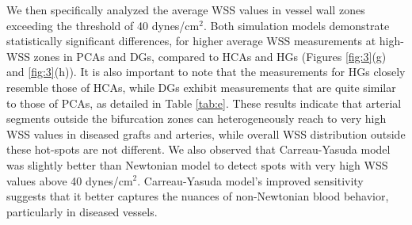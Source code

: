﻿\documentclass[12pt,a4paper]{article}
\theoremstyle{definition}
\numberwithin{equation}{section}
\begin{document}
We then specifically analyzed the average WSS values in vessel wall zones exceeding the threshold of 40 dynes/cm$^2$. Both simulation models demonstrate statistically significant differences, for higher average WSS measurements at high-WSS zones in PCAs and DGs, compared to HCAs and HGs (Figures \ref{fig:3}(g) and \ref{fig:3}(h)). It is also important to note that the measurements for HGs closely resemble those of HCAs, while DGs exhibit measurements that are quite similar to those of PCAs, as detailed in Table \ref{tab:e}. These results indicate that arterial segments outside the bifurcation zones can heterogeneously reach to very high WSS values in diseased grafts and arteries, while overall WSS distribution outside these hot-spots are not different. We also observed that Carreau-Yasuda model was slightly better than Newtonian model to detect spots with very high WSS values above 40 dynes/cm$^2$. Carreau-Yasuda model's improved sensitivity suggests that it better captures the nuances of non-Newtonian blood behavior, particularly in diseased vessels.
\end{document}
